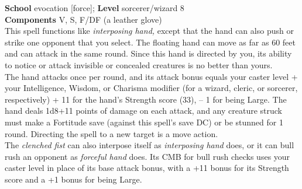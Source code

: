 \textbf{School} evocation [force]; \textbf{Level} sorcerer/wizard 8\\
\textbf{Components} V, S, F/DF (a leather glove)\\
This spell functions like \textit{interposing hand, }except that the hand can also push or strike one opponent that you select. The floating hand can move as far as 60 feet and can attack in the same round. Since this hand is directed by you, its ability to notice or attack invisible or concealed creatures is no better than yours.\\
The hand attacks once per round, and its attack bonus equals your caster level + your Intelligence, Wisdom, or Charisma modifier (for a wizard, cleric, or sorcerer, respectively) + 11 for the hand's Strength score (33), – 1 for being Large. The hand deals 1d8+11 points of damage on each attack, and any creature struck must make a Fortitude save (against this spell's save DC) or be stunned for 1 round. Directing the spell to a new target is a move action.\\
The \textit{clenched fist }can also interpose itself as \textit{interposing hand }does, or it can bull rush an opponent as \textit{forceful hand }does. Its CMB for bull rush checks uses your caster level in place of its base attack bonus, with a +11 bonus for its Strength score and a +1 bonus for being Large.\\
